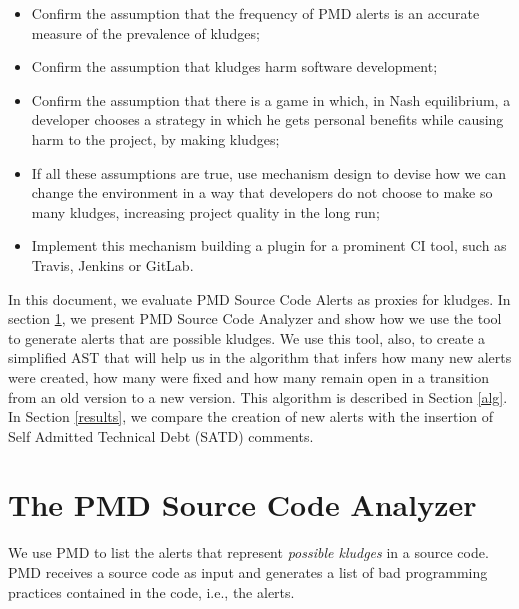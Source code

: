 \documentclass[
]{article}
\begin{document}
\begin{itemize}
\item
  Confirm the assumption that the frequency of PMD alerts is an accurate
  measure of the prevalence of kludges;
  
\item
  Confirm the assumption that kludges harm software development;

\item
  Confirm the assumption that there is a game in which, in Nash
  equilibrium, a developer chooses a strategy in which he gets personal
  benefits while causing harm to the project, by making kludges;

\item
  If all these assumptions are true, use mechanism design to devise how
  we can change the environment in a way that developers do not choose
  to make so many kludges, increasing project quality in the long run;

\item
  Implement this mechanism building a plugin for a prominent CI tool,
  such as Travis, Jenkins or GitLab.
\end{itemize}

In this document, we evaluate PMD Source Code Alerts as proxies for
kludges. In section \ref{pmd}, we present PMD Source Code Analyzer and
show how we use the tool to generate alerts that are possible kludges.
We use this tool, also, to create a simplified AST that will help us in
the algorithm that infers how many new alerts were created, how many
were fixed and how many remain open in a transition from an old version
to a new version. This algorithm is described in Section \ref{alg}. In
Section \ref{results}, we compare the creation of new alerts with the
insertion of Self Admitted Technical Debt (SATD) comments.


\section{The PMD Source Code Analyzer}\label{pmd}

We use PMD to list the alerts that represent \textit{possible kludges}
in a source code. PMD receives a source code as input and generates a
list of bad programming practices contained in the code, i.e., the
alerts.
\end{document}
